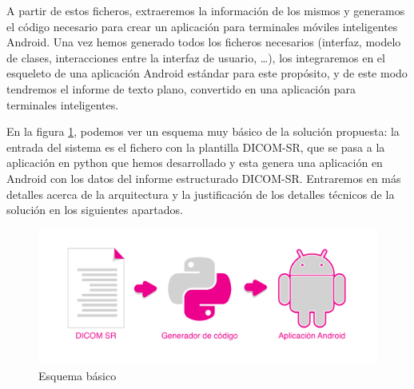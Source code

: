A partir de estos ficheros, extraeremos la información de los mismos y generamos el código necesario para crear un aplicación para terminales móviles inteligentes Android. Una vez hemos generado todos los ficheros necesarios (interfaz, modelo de clases, interacciones entre la interfaz de usuario, \ldots), los integraremos en el esqueleto de una aplicación Android estándar para este propósito, y de este modo tendremos el informe de texto plano, convertido en una aplicación para terminales inteligentes.\par
En la figura \ref{fig:basic_schema}, podemos ver un esquema muy básico de la solución propuesta: la entrada del sistema es el fichero con la plantilla DICOM-SR, que se pasa a la aplicación en python que hemos desarrollado y esta genera una aplicación en Android con los datos del informe estructurado DICOM-SR. Entraremos en más detalles acerca de la arquitectura y la justificación de los detalles técnicos de la solución en los siguientes apartados.\bigskip\par

\begin{figure}[ht]
\centering
\includegraphics[scale=0.6]{./imgs/esquemas/simple.pdf}
\caption{Esquema básico}
\label{fig:basic_schema}
\end{figure}

